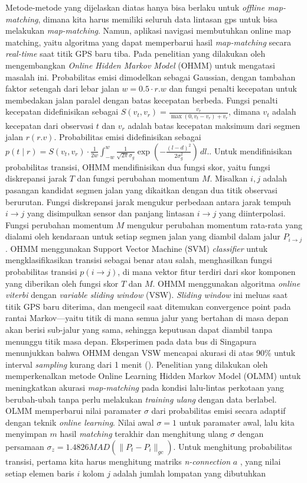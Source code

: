 Metode-metode yang dijelaskan diatas hanya bisa berlaku untuk \textit{offline map-matching}, dimana kita harus memiliki seluruh data lintasan gps untuk bisa melakukan \textit{map-matching}. Namun, aplikasi navigasi membutuhkan online map matching, yaitu algoritma yang dapat memperbarui hasil \textit{map-matching} secara \textit{real-time} saat titik GPS baru tiba. Pada penelitian yang dilakukan oleh \cite{Goh2012} mengembangkan \textit{Online Hidden Markov Model} (OHMM) untuk mengatasi masalah ini. Probabilitas emisi dimodelkan sebagai Gaussian, dengan tambahan faktor setengah dari lebar jalan $w=0.5 \cdot r.w$ dan fungsi penalti kecepatan untuk membedakan jalan paralel dengan batas kecepatan berbeda. Fungsi penalti kecepatan didefinisikan sebagai $S(v_t,v_r)=\frac{v_r}{\max (0,v_t-v_r)+v_r}$, dimana $v_t$ adalah kecepatan dari observasi $t$ dan $v_r$ adalah batas kecepatan maksimum dari segmen jalan $r (r.v)$. Probabilitas emisi didefinisikan sebagai $p(t\mid r)=S(v_t,v_r) \cdot \frac{1}{2w} \int_{-w}^{w} \frac{1}{\sqrt{2\pi}\sigma_g} \exp\left( -\frac{(l - d)^2}{2\sigma_g^2} \right) \, dl.$. Untuk mendifinisikan probabilitas transisi, OHMM mendifinisikan dua fungsi skor, yaitu fungsi diskrepansi jarak $T$ dan fungsi perubahan momentum $M$. Misalkan $i,j$ adalah pasangan kandidat segmen jalan yang dikaitkan dengan dua titik observasi berurutan. Fungsi diskrepansi jarak mengukur perbedaan antara jarak tempuh $i\rightarrow j$ yang disimpulkan sensor dan panjang lintasan $i\rightarrow j$ yang diinterpolasi. Fungsi perubahan momentum $M$ mengukur perubahan momentum rata-rata yang dialami oleh kendaraan untuk setiap segmen jalan yang diambil dalam jalur $P_{i\rightarrow j}$. OHMM menggunakan Support Vector Machine (SVM) \textit{classifier} untuk mengklasifikasikan transisi sebagai benar atau salah, menghasilkan fungsi probabilitas transisi $p(i\rightarrow j)$, di mana vektor fitur terdiri dari skor komponen yang diberikan oleh fungsi skor $T$ dan $M$. OHMM menggunakan algoritma \textit{online viterbi} dengan \textit{variable sliding window} (VSW). \textit{Sliding window} ini meluas saat titik GPS baru diterima, dan mengecil saat ditemukan convergence point pada rantai Markov—yaitu titik di mana semua jalur yang bertahan di masa depan akan berisi sub-jalur yang sama, sehingga keputusan dapat diambil tanpa menunggu titik masa depan. Eksperimen pada data bus di Singapura menunjukkan bahwa OHMM dengan VSW mencapai akurasi di atas 90\% untuk interval \textit{sampling} kurang dari 1 menit (\cite{Goh2012}). Penelitian yang dilakukan oleh \cite{Liang2016} memperkenalkan metode Online Learning Hidden Markov Model (OLMM) untuk meningkatkan akurasi \textit{map-matching} pada kondisi lalu-lintas perkotaan yang berubah-ubah tanpa perlu melakukan \textit{training ulang} dengan data berlabel. OLMM memperbarui nilai paramater $\sigma$ dari probabilitas emisi secara adaptif dengan teknik \textit{online learning}. Nilai awal $\sigma=1$ untuk paramater awal, lalu kita menyimpan $m$ hasil \textit{matching} terakhir dan menghitung ulang $\sigma$ dengan persamaan $\sigma_z=1.4826MAD(\lVert P_t-P_i\rVert_{gc})$. Untuk menghitung probabilitas transisi, pertama kita harus menghitung matriks \textit{n-connection} $a$ , yang nilai setiap elemen baris $i$ kolom $j$ adalah jumlah lompatan yang dibutuhkan 